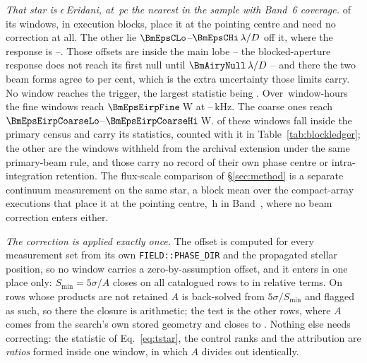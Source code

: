 \emph{That star is $\epsilon$\,Eridani, at \BmEpsDistPc\,pc the nearest in the
sample with Band~6 coverage.} \BmEpsNOn{} of its \BmEpsNWin{} windows, in
\BmEpsNBlock{} execution blocks, place it at the pointing centre and need no
correction at all. The other \BmEpsNOff{} lie
$\BmEpsCLo$--$\BmEpsCHi\,\lambda/D$ off it, where the response is
\BmEpsRespLo--\BmEpsRespHi. Those offsets are inside the main lobe -- the
blocked-aperture response does not reach its first null until
$\BmAiryNull\,\lambda/D$ -- and there the two beam forms agree to
\BmEpsAgreePct{} per cent, which is the extra uncertainty those limits carry.
No window reaches the trigger, the largest statistic being \BmEpsTMax. Over
\BmEpsHours\,window-hours the \BmEpsNFine{} fine windows reach
$\BmEpsEirpFine$\,W at \BmEpsChanFineKHzLo--\BmEpsChanFineKHzHi\,kHz. The
\BmEpsNCoarse{} coarse ones reach
$\BmEpsEirpCoarseLo$--$\BmEpsEirpCoarseHi$\,W. \BmEpsNCensus{} of these
windows fall inside the primary census and carry its statistics, counted with
it in Table~\ref{tab:blockledger}; the other \BmEpsNExt{} are the
\LdgExtWithheldWin{} windows withheld from the archival extension under the
same primary-beam rule, and those carry no record of their own phase centre or
intra-integration retention. The
flux-scale
comparison of \S\ref{sec:method} is a separate continuum measurement on the
same star, a block mean over the \PxEpsN{} compact-array executions that place
it at the pointing centre, \PxEpsHours\,h in Band~\PxEpsBand, where no beam
correction enters either.

\emph{The correction is applied exactly once.} The offset is computed for
every measurement set from its own \texttt{FIELD::PHASE\_DIR} and the
propagated stellar position, so no window carries a zero-by-assumption
offset, and it enters in one place only: $S_{\min}=5\sigma/A$ closes on all
\PbSminClosed{} catalogued rows to \PbSminWorstRes{} in relative terms. On
\PbSminTaut{} rows whose products are not retained $A$ is back-solved from
$5\sigma/S_{\min}$ and flagged as such, so there the closure is arithmetic;
the test is the other \PbSminIndep{} rows, where $A$ comes from the search's
own stored geometry and closes to \PbSminIndepRes. Nothing else needs
correcting: the statistic of
Eq.~\ref{eq:tstar}, the control ranks and the attribution are \emph{ratios}
formed inside one window, in which $A$ divides out identically.

